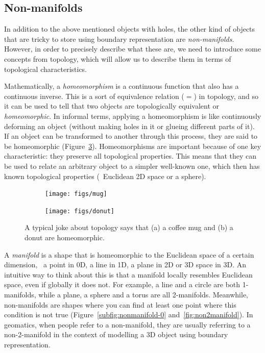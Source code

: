 \subsection{Non-manifolds}

In addition to the above mentioned objects with holes, the other kind of objects that are tricky to store using boundary representation are \emph{non-manifolds}.
However, in order to precisely describe what these are, we need to introduce some concepts from topology, which will allow us to describe them in terms of topological characteristics.

Mathematically, a \emph{homeomorphism} is a continuous function that also has a continuous inverse.
This is a sort of equivalence relation (\(=\)) in topology, and so it can be used to tell that two objects are topologically equivalent or \emph{homeomorphic}.
In informal terms, applying a homeomorphism is like continuously deforming an object (without making holes in it or glueing different parts of it).
If an object can be transformed to another through this process, they are said to be homeomorphic (Figure~\ref{fig:homeomorphism}).
Homeomorphisms are important because of one key characteristic: they preserve all topological properties.
This means that they can be used to relate an arbitrary object to a simpler well-known one, which then has known topological properties (\eg\ Euclidean 2D space or a sphere).

\begin{figure}[htbp]
\centering
\begin{subfigure}[b]{0.4\linewidth}
\texttt{[image: figs/mug]}
\caption{}%
\label{subfig:mug}
\end{subfigure}
\quad
\begin{subfigure}[b]{0.4\linewidth}
\texttt{[image: figs/donut]}
\caption{}%
\label{subfig:donut}
\end{subfigure}
\caption[A typical joke about topology]{A typical joke about topology says that (a) a coffee mug and (b) a donut are homeomorphic.}%
\label{fig:homeomorphism}
\end{figure}

A \emph{manifold} is a shape that is homeomorphic to the Euclidean space of a certain dimension, \ie\ a point in 0D, a line in 1D, a plane in 2D or 3D space in 3D.
An intuitive way to think about this is that a manifold locally resembles Euclidean space, even if globally it does not.
For example, a line and a circle are both 1-manifolds, while a plane, a sphere and a torus are all 2-manifolds.
Meanwhile, non-manifolds are shapes where you can find at least one point where this condition is not true (Figure~\ref{subfig:nonmanifold-0} and~\ref{fig:non2manifold}).
In geomatics, when people refer to a non-manifold, they are usually referring to a non-2-manifold in the context of modelling a 3D object using boundary representation.

